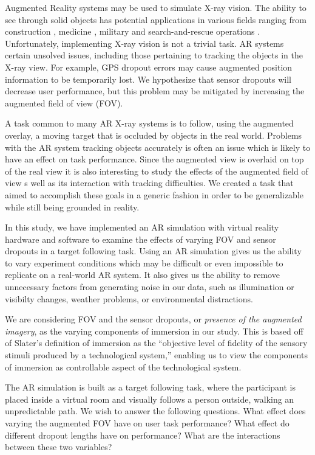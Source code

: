 \documentclass{acmsiggraph}                     %
\begin{document}

Augmented Reality systems may be used to simulate X-ray vision.  The ability to see through solid objects has potential applications in various fields ranging from construction \cite{Webster96augmentedreality}, medicine \cite{azuma95survey}, military \cite{Livingston02anaugmented} and search-and-rescue operations \cite{1528424}.  Unfortunately, implementing X-ray vision is not a trivial task.  AR systems certain unsolved issues, including those pertaining to tracking the objects in the X-ray view.  For example, GPS dropout errors \cite{4079263} may cause augmented position information to be temporarily lost.  We hypothesize that sensor dropouts will decrease user performance, but this problem may be mitigated by increasing the augmented field of view (FOV).

A task common to many AR X-ray systems is to follow, using the augmented overlay, a moving target that is occluded by objects in the real world.  Problems with the AR system tracking objects accurately is often an issue which is likely to have an effect on task performance.  Since the augmented view is overlaid on top of the real view it is also interesting to study the effects of the augmented field of view s well as its interaction with tracking difficulties.  We created a task that aimed to accomplish these goals in a generic fashion in order to be generalizable while still being grounded in reality.

In this study, we have implemented an AR simulation with virtual reality hardware and software to examine the effects of varying FOV and sensor dropouts in a target following task.  Using an AR simulation gives us the ability to vary experiment conditions which may be difficult or even impossible to replicate on a real-world AR system.  It also gives us the ability to remove unnecessary factors from generating noise in our data, such as illumination or visibilty changes, weather problems, or environmental distractions. 

We are considering FOV and the sensor dropouts, or \emph{presence of the augmented imagery}, as the varying components of immersion in our study.  This is based off of Slater's definition \cite{slater} of immersion as the ``objective level of fidelity of the sensory stimuli produced by a technological system,''  enabling us to view the components of immersion as controllable aspect of the technological system.

The AR simulation is built as a target following task, where the participant is placed inside a virtual room and visually follows a person outside, walking an unpredictable path.  We wish to answer the following questions.  What effect does varying the augmented FOV have on user task performance?  What effect do different dropout lengths have on performance?  What are the interactions between these two variables?
\end{document}
